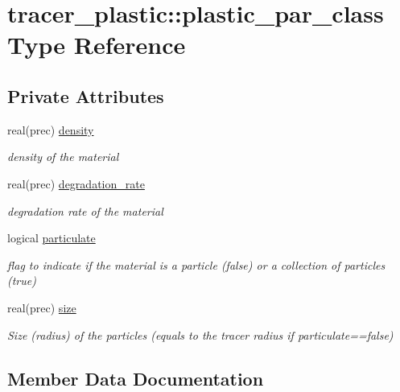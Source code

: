 \hypertarget{structtracer__plastic_1_1plastic__par__class}{}\section{tracer\+\_\+plastic\+:\+:plastic\+\_\+par\+\_\+class Type Reference}
\label{structtracer__plastic_1_1plastic__par__class}
\subsection*{Private Attributes}
\begin{DoxyCompactItemize}
\item 
real(prec) \hyperlink{structtracer__plastic_1_1plastic__par__class_af0ae9b2aec29bff71a16780c5f75c8e2}{density}
\begin{DoxyCompactList}\small\item\em density of the material \end{DoxyCompactList}\item 
real(prec) \hyperlink{structtracer__plastic_1_1plastic__par__class_afce16ca3606bcfc7f4455c46232aa057}{degradation\+\_\+rate}
\begin{DoxyCompactList}\small\item\em degradation rate of the material \end{DoxyCompactList}\item 
logical \hyperlink{structtracer__plastic_1_1plastic__par__class_abf8dcf5f65aef6d095a75a2d10dc5517}{particulate}
\begin{DoxyCompactList}\small\item\em flag to indicate if the material is a particle (false) or a collection of particles (true) \end{DoxyCompactList}\item 
real(prec) \hyperlink{structtracer__plastic_1_1plastic__par__class_ae7f5294e339ec13e0d5f0213fe66e026}{size}
\begin{DoxyCompactList}\small\item\em Size (radius) of the particles (equals to the tracer radius if particulate==false) \end{DoxyCompactList}\end{DoxyCompactItemize}


\subsection{Member Data Documentation}
\mbox{\label{structtracer__plastic_1_1plastic__par__class_afce16ca3606bcfc7f4455c46232aa057}} 
